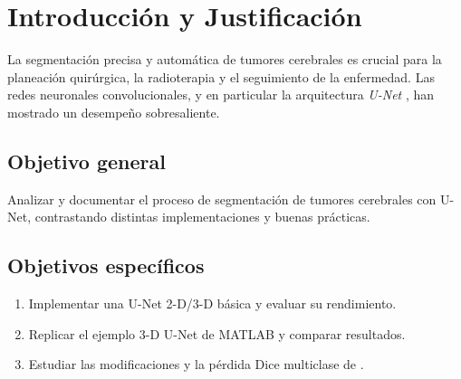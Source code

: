\chapter{Introducción y Justificación}

La segmentación precisa y automática de tumores cerebrales es crucial
para la planeación quirúrgica, la radioterapia y el seguimiento de la
enfermedad. Las redes neuronales convolucionales, y en particular la
arquitectura \textit{U-Net} \cite{ronneberger2015unet}, han mostrado un
desempeño sobresaliente.

\section*{Objetivo general}
Analizar y documentar el proceso de segmentación de tumores cerebrales
con U-Net, contrastando distintas implementaciones y buenas prácticas.

\section*{Objetivos específicos}
\begin{enumerate}[label=\alph*)]
  \item Implementar una U-Net 2-D/3-D básica y evaluar su rendimiento.
  \item Replicar el ejemplo 3-D U-Net de MATLAB y comparar resultados.
  \item Estudiar las modificaciones y la pérdida Dice multiclase de \cite{isensee2018brats}.
\end{enumerate}
